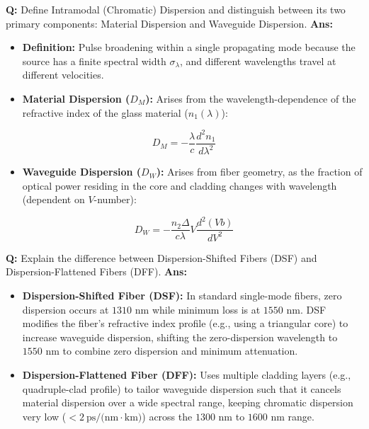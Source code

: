 \documentclass[10pt,a4paper,twocolumn]{article}
\begin{document}
\begin{tcolorbox}[
  colback=white,
  colframe=UnitColorThree,
  colbacktitle=gray!10!white,
  coltitle=black,
  fonttitle=\bfseries\sffamily\small,
  title={Unit III $\bullet$ Card 5: Intramodal (Chromatic) Dispersion},
  boxrule=1.2pt,
  arc=2mm,
  outer arc=2mm,
  boxsep=1.5mm,
  top=1mm,
  bottom=1mm,
  left=1.5mm,
  right=1.5mm,
  before skip=2.5mm,
  after skip=2.5mm
]
\textbf{Q:} Define Intramodal (Chromatic) Dispersion and distinguish between its two primary components: Material Dispersion and Waveguide Dispersion.
\tcbline
\textbf{Ans:} \begin{itemize}
  \item   \textbf{Definition:} Pulse broadening within a single propagating mode because the source has a finite spectral width $\sigma_\lambda$, and different wavelengths travel at different velocities.
  \item   \textbf{Material Dispersion ($D_M$):} Arises from the wavelength-dependence of the refractive index of the glass material ($n_1(\lambda)$):
\end{itemize}
        \[ D_M = -\frac{\lambda}{c} \frac{d^2 n_1}{d\lambda^2} \]
\begin{itemize}
  \item   \textbf{Waveguide Dispersion ($D_W$):} Arises from fiber geometry, as the fraction of optical power residing in the core and cladding changes with wavelength (dependent on $V$-number):
\end{itemize}
        \[ D_W = -\frac{n_2 \Delta}{c \lambda} V \frac{d^2(Vb)}{dV^2} \]
\end{tcolorbox}


\begin{tcolorbox}[
  colback=white,
  colframe=UnitColorThree,
  colbacktitle=gray!10!white,
  coltitle=black,
  fonttitle=\bfseries\sffamily\small,
  title={Unit III $\bullet$ Card 6: Dispersion-Shifted vs. Dispersion-Flattened Fibers},
  boxrule=1.2pt,
  arc=2mm,
  outer arc=2mm,
  boxsep=1.5mm,
  top=1mm,
  bottom=1mm,
  left=1.5mm,
  right=1.5mm,
  before skip=2.5mm,
  after skip=2.5mm
]
\textbf{Q:} Explain the difference between Dispersion-Shifted Fibers (DSF) and Dispersion-Flattened Fibers (DFF).
\tcbline
\textbf{Ans:} \begin{itemize}
  \item   \textbf{Dispersion-Shifted Fiber (DSF):} In standard single-mode fibers, zero dispersion occurs at $1310\text{ nm}$ while minimum loss is at $1550\text{ nm}$. DSF modifies the fiber's refractive index profile (e.g., using a triangular core) to increase waveguide dispersion, shifting the zero-dispersion wavelength to $1550\text{ nm}$ to combine zero dispersion and minimum attenuation.
  \item   \textbf{Dispersion-Flattened Fiber (DFF):} Uses multiple cladding layers (e.g., quadruple-clad profile) to tailor waveguide dispersion such that it cancels material dispersion over a wide spectral range, keeping chromatic dispersion very low ($< 2\ \text{ps/(nm}\cdot\text{km)}$) across the $1300\text{ nm}$ to $1600\text{ nm}$ range.
\end{itemize}
\end{tcolorbox}
\end{document}
